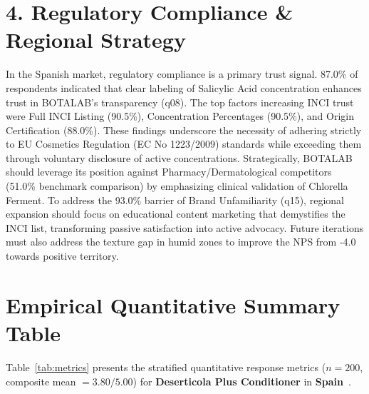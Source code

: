 \documentclass[10pt,twocolumn,a4paper]{article}
\begin{document}
\section{4. Regulatory Compliance \& Regional Strategy}
In the Spanish market, regulatory compliance is a primary trust signal. 87.0\% of respondents indicated that clear labeling of Salicylic Acid concentration enhances trust in BOTALAB’s transparency (q08). The top factors increasing INCI trust were Full INCI Listing (90.5\%), Concentration Percentages (90.5\%), and Origin Certification (88.0\%). These findings underscore the necessity of adhering strictly to EU Cosmetics Regulation (EC No 1223/2009) standards while exceeding them through voluntary disclosure of active concentrations. Strategically, BOTALAB should leverage its position against Pharmacy/Dermatological competitors (51.0\% benchmark comparison) by emphasizing clinical validation of Chlorella Ferment. To address the 93.0\% barrier of Brand Unfamiliarity (q15), regional expansion should focus on educational content marketing that demystifies the INCI list, transforming passive satisfaction into active advocacy. Future iterations must also address the texture gap in humid zones to improve the NPS from -4.0 towards positive territory.


\section{Empirical Quantitative Summary Table}
Table~\ref{tab:metrics} presents the stratified quantitative response metrics ($n = 200$, composite mean $= 3.80/5.00$) for \textbf{Deserticola Plus Conditioner} in \textbf{Spain}~\cite{ref_kaggle_doi,ref_hf_doi}.
\end{document}
